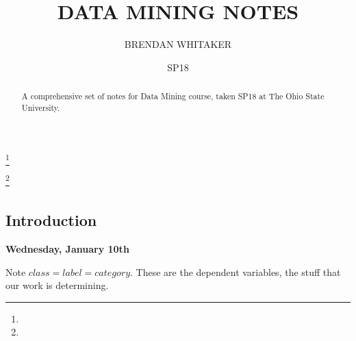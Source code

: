 \documentclass{amsbook}
\theoremstyle{plain}
\theoremstyle{definition}
\theoremstyle{remark}
\begin{document}
\frontmatter

\title{DATA MINING NOTES}


\author{BRENDAN WHITAKER}
\address{}
\curraddr{}
\email{}
\thanks{}

\author{}
\address{}
\curraddr{}
\email{}
\thanks{}


\keywords{}

\date{SP18}

\begin{abstract}
A comprehensive set of notes for Data Mining course, taken SP18 at The Ohio State University. 
\end{abstract}

  \maketitle


\setcounter{page}{4}

\tableofcontents





\mainmatter

\setcounter{part}{0}
\part{}
\setcounter{chapter}{0}
\chapter{Introduction}

\textbf{Wednesday, January 10th}

Note $class = label = category$. These are the dependent variables, the stuff that our work is determining. 
\end{document}
